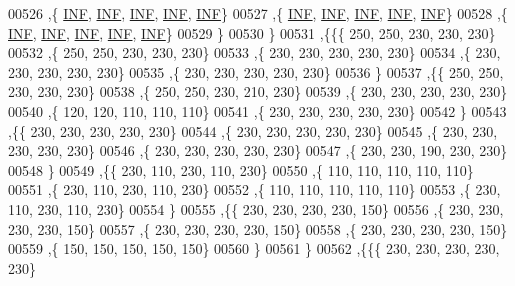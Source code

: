 \begin{DoxyCode}
00526    ,\{   \mbox{\hyperlink{1_88_84__epars_8h_a12c2040f25d8e3a7b9e1c2024c618cb6}{INF}},   \mbox{\hyperlink{1_88_84__epars_8h_a12c2040f25d8e3a7b9e1c2024c618cb6}{INF}},   \mbox{\hyperlink{1_88_84__epars_8h_a12c2040f25d8e3a7b9e1c2024c618cb6}{INF}},   \mbox{\hyperlink{1_88_84__epars_8h_a12c2040f25d8e3a7b9e1c2024c618cb6}{INF}},   \mbox{\hyperlink{1_88_84__epars_8h_a12c2040f25d8e3a7b9e1c2024c618cb6}{INF}}\}
00527    ,\{   \mbox{\hyperlink{1_88_84__epars_8h_a12c2040f25d8e3a7b9e1c2024c618cb6}{INF}},   \mbox{\hyperlink{1_88_84__epars_8h_a12c2040f25d8e3a7b9e1c2024c618cb6}{INF}},   \mbox{\hyperlink{1_88_84__epars_8h_a12c2040f25d8e3a7b9e1c2024c618cb6}{INF}},   \mbox{\hyperlink{1_88_84__epars_8h_a12c2040f25d8e3a7b9e1c2024c618cb6}{INF}},   \mbox{\hyperlink{1_88_84__epars_8h_a12c2040f25d8e3a7b9e1c2024c618cb6}{INF}}\}
00528    ,\{   \mbox{\hyperlink{1_88_84__epars_8h_a12c2040f25d8e3a7b9e1c2024c618cb6}{INF}},   \mbox{\hyperlink{1_88_84__epars_8h_a12c2040f25d8e3a7b9e1c2024c618cb6}{INF}},   \mbox{\hyperlink{1_88_84__epars_8h_a12c2040f25d8e3a7b9e1c2024c618cb6}{INF}},   \mbox{\hyperlink{1_88_84__epars_8h_a12c2040f25d8e3a7b9e1c2024c618cb6}{INF}},   \mbox{\hyperlink{1_88_84__epars_8h_a12c2040f25d8e3a7b9e1c2024c618cb6}{INF}}\}
00529    \}
00530   \}
00531  ,\{\{\{   250,   250,   230,   230,   230\}
00532    ,\{   250,   250,   230,   230,   230\}
00533    ,\{   230,   230,   230,   230,   230\}
00534    ,\{   230,   230,   230,   230,   230\}
00535    ,\{   230,   230,   230,   230,   230\}
00536    \}
00537   ,\{\{   250,   250,   230,   230,   230\}
00538    ,\{   250,   250,   230,   210,   230\}
00539    ,\{   230,   230,   230,   230,   230\}
00540    ,\{   120,   120,   110,   110,   110\}
00541    ,\{   230,   230,   230,   230,   230\}
00542    \}
00543   ,\{\{   230,   230,   230,   230,   230\}
00544    ,\{   230,   230,   230,   230,   230\}
00545    ,\{   230,   230,   230,   230,   230\}
00546    ,\{   230,   230,   230,   230,   230\}
00547    ,\{   230,   230,   190,   230,   230\}
00548    \}
00549   ,\{\{   230,   110,   230,   110,   230\}
00550    ,\{   110,   110,   110,   110,   110\}
00551    ,\{   230,   110,   230,   110,   230\}
00552    ,\{   110,   110,   110,   110,   110\}
00553    ,\{   230,   110,   230,   110,   230\}
00554    \}
00555   ,\{\{   230,   230,   230,   230,   150\}
00556    ,\{   230,   230,   230,   230,   150\}
00557    ,\{   230,   230,   230,   230,   150\}
00558    ,\{   230,   230,   230,   230,   150\}
00559    ,\{   150,   150,   150,   150,   150\}
00560    \}
00561   \}
00562  ,\{\{\{   230,   230,   230,   230,   230\}

\end{DoxyCode}
